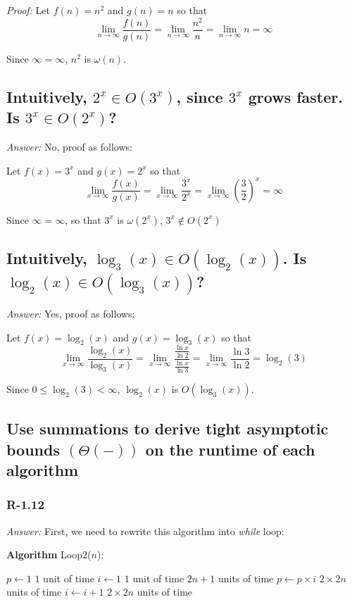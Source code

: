 \documentclass[11pt]{article}
\begin{document}
	\emph{Proof:} Let $f(n)=n^2$ and $g(n)=n$ so that
	\begin{equation*}
		\lim_{n\to\infty} \frac{f(n)}{g(n)}=\lim_{n\to\infty} \frac{n^2}{n}=\lim_{n\to\infty} n=\infty
	\end{equation*}
	
	Since $\infty = \infty$, $n^2$ is $\omega(n)$.
\subsection{Intuitively, $2^x\in O(3^x)$, since $3^x$ grows faster. Is $3^x\in O(2^x)$?}
	\emph{Answer:} No, proof as follows:
	
	Let $f(x)=3^x$ and $g(x)=2^x$ so that
	\begin{equation*}
		\lim_{x\to\infty} \frac{f(x)}{g(x)}=\lim_{x\to\infty} \frac{3^x}{2^x}=\lim_{x\to\infty} (\frac{3}{2})^x=\infty
	\end{equation*}
	
	Since $\infty = \infty$, so that $3^x$ is $\omega(2^x)$, $3^x\not\in O(2^x)$
\subsection{Intuitively, $\log_3(x)\in O(\log_2(x))$. Is $\log_2(x)\in O(\log_3(x))$?}
	\emph{Answer:} Yes, proof as follows:
	
	Let $f(x)=\log_2(x)$ and $g(x)=\log_3(x)$ so that
	\begin{equation*}
		\lim_{x\to\infty} \frac{\log_2(x)}{\log_3(x)} = \lim_{x\to\infty} \frac{\frac{\ln x}{\ln 2}}{\frac{\ln x}{\ln 3}} = \lim_{x\to\infty} \frac{\ln 3}{\ln 2} = \log_2(3)
	\end{equation*}
	
	Since $0\leq \log_2(3)<\infty$, $\log_2(x)$ is $O(\log_3(x))$.
\subsection{Use summations to derive tight asymptotic bounds $(\Theta (-))$ on the runtime of each algorithm}
\subsubsection{R-1.12}
	\emph{Answer:}
	First, we need to rewrite this algorithm into \emph{while} loop:
	
	\textbf{Algorithm} Loop2($n$):
	
	\begin{algorithmic}
		\State $p \gets 1$ \Comment $1$ unit of time
		\State $i \gets 1$ \Comment $1$ unit of time
		 \Comment $2n+1$ units of time
			\State $p \gets p \times i$ \Comment $2\times 2n$ units of time
			\State $i \gets i + 1$ \Comment $2\times 2n$ units of time
		\EndWhile
	\end{algorithmic}
	
\end{document}
